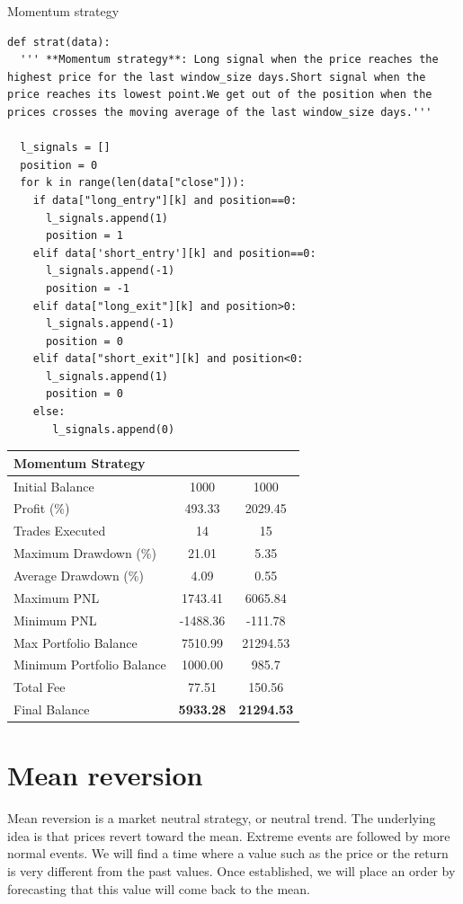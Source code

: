 \documentclass[a4paper,11pt]{article}  %
\begin{document}
\begin{bluebox}{Momentum strategy}
\begin{lstlisting}
def strat(data):
  ''' **Momentum strategy**: Long signal when the price reaches the highest price for the last window_size days.Short signal when the price reaches its lowest point.We get out of the position when the prices crosses the moving average of the last window_size days.'''
  
  l_signals = []
  position = 0
  for k in range(len(data["close"])):
    if data["long_entry"][k] and position==0:
      l_signals.append(1)
      position = 1
    elif data['short_entry'][k] and position==0:
      l_signals.append(-1)
      position = -1
    elif data["long_exit"][k] and position>0:
      l_signals.append(-1)
      position = 0
    elif data["short_exit"][k] and position<0:
      l_signals.append(1)        
      position = 0
    else:
       l_signals.append(0)
\end{lstlisting}
\end{bluebox}

\begin{tabular}{lSS} \toprule
\textbf{ Momentum Strategy}  &   & \\ \midrule
Initial Balance & 1000 & 1000\\
Profit (\%) & 493.33 &  2029.45\\  
Trades Executed &  14 & 15\\
Maximum Drawdown (\%) &  21.01 & 5.35\\
Average Drawdown (\%) &  4.09&0.55 \\

Maximum PNL &  1743.41&   6065.84\\
Minimum PNL &  -1488.36&  -111.78\\
Max Portfolio Balance  & 7510.99 & 21294.53\\
Minimum Portfolio Balance &  1000.00& 985.7\\ 
Total Fee &  77.51 & 150.56\\ \midrule
Final Balance &   \textbf{5933.28}& \textbf{21294.53} \\ \bottomrule
\end{tabular}

\section{Mean reversion}

Mean reversion is a market neutral strategy, or neutral trend. The underlying idea is that prices revert toward the mean.
Extreme events are followed by more normal events. We will find a time where a value
such as the price or the return is very different from the past values. Once established, we
will place an order by forecasting that this value will come back to the mean.\\
\end{document}
